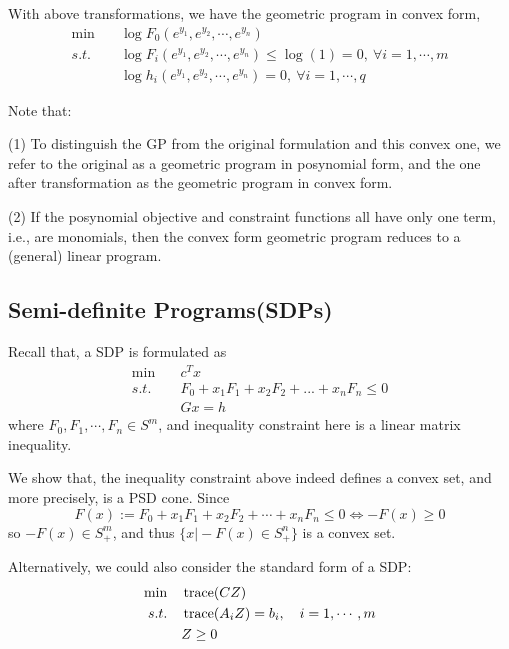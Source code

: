 With above transformations, we have the geometric program in convex form, 
\begin{align*}
\min\quad & \log F_0(e^{y_1},e^{y_2},\cdots,e^{y_n}) \\
s.t. \quad& \log F_i(e^{y_1},e^{y_2},\cdots,e^{y_n}) \leq \log(1) = 0,\ \forall i=1,\cdots,m\\
&\log h_i(e^{y_1},e^{y_2},\cdots,e^{y_n}) = 0,\ \forall i=1,\cdots,q
\end{align*}

Note that:

(1) To distinguish the GP from the original formulation and this convex one, we refer to the original as a geometric program in posynomial form, and the one after transformation as the geometric program in convex form.

(2) If the posynomial objective and constraint functions all have only one term, i.e., are monomials, then the convex form geometric program reduces to a (general) linear program.


\vspace{0.5cm}
\subsection{Semi-definite Programs(SDPs)}
Recall that, a SDP is formulated as 
\begin{align*}
\min \quad&c^Tx \\
s.t. \quad&F_0 + x_1F_1 + x_2F_2 + ... + x_nF_n \leq 0\\
&Gx = h
\end{align*}
where $F_0, F_1, \cdots, F_n \in S^m$, and inequality constraint here is a linear matrix inequality.

We show that, the inequality constraint above indeed defines a convex set, and more precisely, is a PSD cone. Since
\begin{equation*}
F(x) := F_0 + x_1F_1 + x_2F_2 + \cdots + x_nF_n  \leq 0 \Leftrightarrow -F(x) \geq 0
\end{equation*}
so $ -F(x) \in S_+^m$, and thus $\{x\vert -F(x)\in S^n_+ \}$ is a convex set. 

Alternatively, we could also consider the standard form of a SDP:
\begin{align*}
\min \quad&\operatorname{trace}(CZ) \\
s.t. \quad&\operatorname{trace}(A_iZ) = b_i, \quad i = 1, \cdots, m\\
&Z\geq 0
\end{align*}

